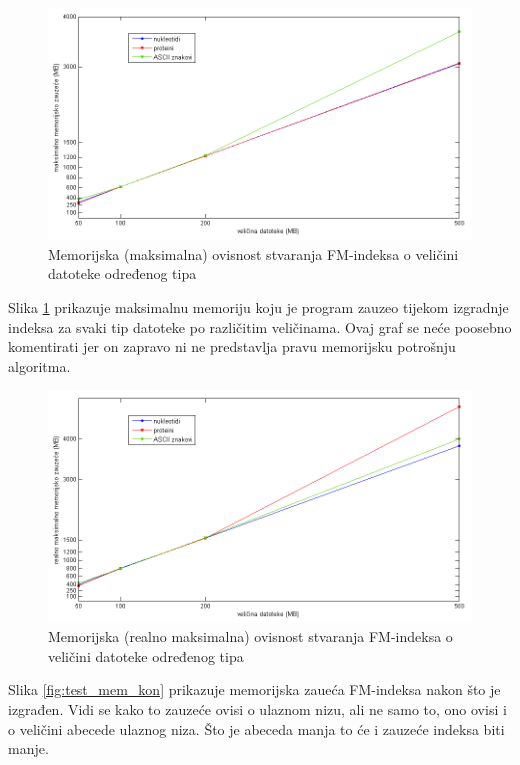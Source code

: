 \begin{figure}[H]
   \centering
       \includegraphics[width=\textwidth]{./pictures/test_mem_max.png}
 \caption{Memorijska (maksimalna) ovisnost stvaranja FM-indeksa o veličini datoteke određenog tipa}
 \label{fig:test_mem_max}
\end{figure}

Slika \ref{fig:test_mem_max} prikazuje maksimalnu memoriju koju je program zauzeo tijekom izgradnje indeksa za svaki tip datoteke po različitim veličinama. Ovaj graf se neće poosebno komentirati jer on zapravo ni ne predstavlja pravu memorijsku potrošnju algoritma.


\begin{figure}[H]
   \centering
       \includegraphics[width=\textwidth]{./pictures/test_mem_realmax.png}
 \caption{Memorijska (realno maksimalna) ovisnost stvaranja FM-indeksa o veličini datoteke određenog tipa}
 \label{fig:test_mem_realmax}
\end{figure}

Slika \ref{fig:test_mem_kon} prikazuje memorijska zaueća FM-indeksa nakon što je izgrađen. Vidi se kako to zauzeće ovisi o ulaznom nizu, ali ne samo to, ono ovisi i o veličini abecede ulaznog niza. Što je abeceda manja to će i zauzeće indeksa biti manje.


